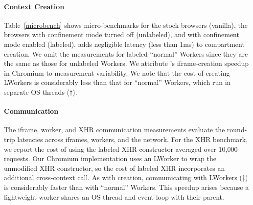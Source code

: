 \paragraph{Context Creation}
Table~\ref{microbench} shows micro-benchmarks for the stock
browsers (vanilla), the \sys{} browsers with confinement mode turned
off (unlabeled), and with confinement mode enabled (labeled).
%
\sys{} adds negligible latency (less than 1ms) to compartment
creation.
%
We omit the measurements for labeled ``normal'' Workers since they are
the same as those for unlabeled Workers.
%
We attribute \sys{}'s iframe-creation speedup in Chromium to measurement
variability.
%
We note that the cost of creating LWorkers is
considerably less than that for ``normal'' Workers, which run in
separate OS threads ($\dagger$).

\paragraph{Communication} The iframe, worker, and XHR communication measurements evaluate the
round-trip latencies across iframes, workers, and the network.
%
For the XHR benchmark, we report the cost of using the labeled XHR
constructor averaged over 10,000 requests.
%
Our Chromium implementation uses an  LWorker to wrap the unmodified
XHR constructor, so the cost of labeled XHR incorporates an additional
cross-context call.
%
As with creation, communicating with LWorkers ($\ddagger$)
is considerably faster than with ``normal'' Workers.
%
This speedup arises because a lightweight worker shares
 an OS thread and event loop with their parent.
%


